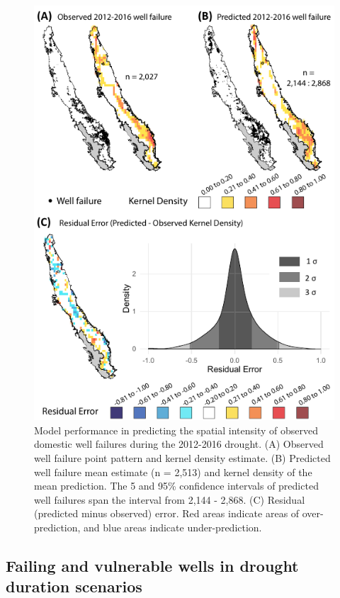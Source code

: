 \begin{figure}%
	\centering
	\includegraphics[width=12cm,keepaspectratio]{ch2_figs/fig_pred_obs_accuracy.pdf}
	\caption{Model performance in predicting the spatial intensity of observed domestic well failures during the 2012-2016 drought. (A) Observed well failure point pattern and kernel density estimate. (B) Predicted well failure mean estimate (n = 2,513) and kernel density of the mean prediction. The 5 and 95\% confidence intervals of predicted well failures span the interval from 2,144 - 2,868. (C) Residual (predicted minus observed) error. Red areas indicate areas of over-prediction, and blue areas indicate under-prediction.}
	\label{fig:pred_obs}
\end{figure}



\subsection{Failing and vulnerable wells in drought duration scenarios}

